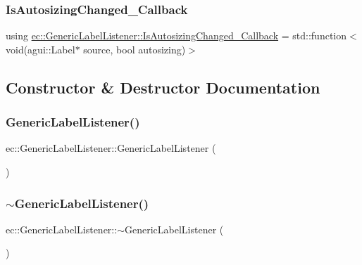 \subsubsection{\texorpdfstring{Is\+Autosizing\+Changed\+\_\+\+Callback}{IsAutosizingChanged\_Callback}}
{\footnotesize\ttfamily using \mbox{\hyperlink{classec_1_1_generic_label_listener_adf4cec1bd13682ce66c52f0484fe46c6}{ec\+::\+Generic\+Label\+Listener\+::\+Is\+Autosizing\+Changed\+\_\+\+Callback}} =  std\+::function$<$void(agui\+::\+Label$\ast$ source, bool autosizing)$>$}



\subsection{Constructor \& Destructor Documentation}
\mbox{\label{classec_1_1_generic_label_listener_a743def8b1800f2bc7d14c3ef05e4fa45}} 
\subsubsection{\texorpdfstring{Generic\+Label\+Listener()}{GenericLabelListener()}}
{\footnotesize\ttfamily ec\+::\+Generic\+Label\+Listener\+::\+Generic\+Label\+Listener (\begin{DoxyParamCaption}{ }\end{DoxyParamCaption})\hspace{0.3cm}{\ttfamily [explicit]}}

\mbox{\label{classec_1_1_generic_label_listener_aaf153b11abad595d7f523d091dec3903}} 
\subsubsection{\texorpdfstring{$\sim$\+Generic\+Label\+Listener()}{~GenericLabelListener()}}
{\footnotesize\ttfamily ec\+::\+Generic\+Label\+Listener\+::$\sim$\+Generic\+Label\+Listener (\begin{DoxyParamCaption}{ }\end{DoxyParamCaption})\hspace{0.3cm}{\ttfamily [default]}}



